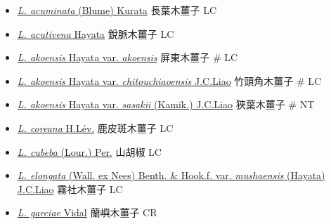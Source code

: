 \begin{itemize}
  \begin{itemize}
        \item[] \href{http://www.theplantlist.org/tpl1.1/search?q=Litsea+acuminata}{\textit{L. acuminata} (Blume) Kurata}   長葉木薑子   LC
        \item[] \href{http://www.theplantlist.org/tpl1.1/search?q=Litsea+acutivena}{\textit{L. acutivena} Hayata}   銳脈木薑子   LC
        \item[] \href{http://www.theplantlist.org/tpl1.1/search?q=Litsea+akoensis+var.+akoensis}{\textit{L. akoensis} Hayata var. \textit{akoensis}}   屏東木薑子  \# LC
        \item[] \href{http://www.theplantlist.org/tpl1.1/search?q=Litsea+akoensis+var.+chitouchiaoensis}{\textit{L. akoensis} Hayata var. \textit{chitouchiaoensis} J.C.Liao}   竹頭角木薑子  \# LC
        \item[] \href{http://www.theplantlist.org/tpl1.1/search?q=Litsea+akoensis+var.+sasakii}{\textit{L. akoensis} Hayata var. \textit{sasakii} (Kamik.) J.C.Liao}   狹葉木薑子  \# NT
        \item[] \href{http://www.theplantlist.org/tpl1.1/search?q=Litsea+coreana}{\textit{L. coreana} H.Lév.}   鹿皮斑木薑子   LC
        \item[] \href{http://www.theplantlist.org/tpl1.1/search?q=Litsea+cubeba}{\textit{L. cubeba} (Lour.) Per.}   山胡椒   LC
        \item[] \href{http://www.theplantlist.org/tpl1.1/search?q=Litsea+elongata+var.+mushaensis}{\textit{L. elongata} (Wall. ex Nees) Benth. \& Hook.f. var. \textit{mushaensis} (Hayata) J.C.Liao}   霧社木薑子   LC
        \item[] \href{http://www.theplantlist.org/tpl1.1/search?q=Litsea+garciae}{\textit{L. garciae} Vidal}   蘭嶼木薑子   CR

\end{itemize}
\end{itemize}
